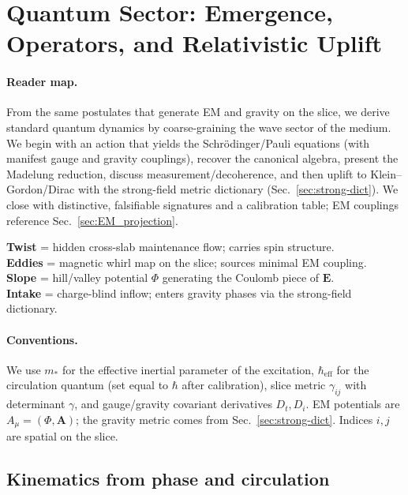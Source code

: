 \section{Quantum Sector: Emergence, Operators, and Relativistic Uplift}
\label{sec:QM_projection}

\paragraph{Reader map.}
From the same postulates that generate EM and gravity on the slice, we derive standard quantum dynamics by coarse-graining the wave sector of the medium. We begin with an action that yields the Schr\"odinger/Pauli equations (with manifest gauge and gravity couplings), recover the canonical algebra, present the Madelung reduction, discuss measurement/decoherence, and then uplift to Klein--Gordon/Dirac with the strong-field metric dictionary (Sec.~\ref{sec:strong-dict}). We close with distinctive, falsifiable signatures and a calibration table; EM couplings reference Sec.~\ref{sec:EM_projection}.

\begin{tcolorbox}[title=Terminology bridge (QM)]
\textbf{Twist} = hidden cross-slab maintenance flow; carries spin structure. \\
\textbf{Eddies} = magnetic whirl map on the slice; sources minimal EM coupling. \\
\textbf{Slope} = hill/valley potential \(\Phi\) generating the Coulomb piece of \(\mathbf E\). \\
\textbf{Intake} = charge-blind inflow; enters gravity phases via the strong-field dictionary.
\end{tcolorbox}

\paragraph{Conventions.}
We use \(m_*\) for the effective inertial parameter of the excitation, \(\hbar_{\mathrm{eff}}\) for the circulation quantum (set equal to \(\hbar\) after calibration), slice metric \(\gamma_{ij}\) with determinant \(\gamma\), and gauge/gravity covariant derivatives \(D_t, D_i\). EM potentials are \(A_\mu=(\Phi,\mathbf A)\); the gravity metric comes from Sec.~\ref{sec:strong-dict}. Indices \(i,j\) are spatial on the slice.

\subsection{Kinematics from phase and circulation}
\label{sec:QM_madelung}


